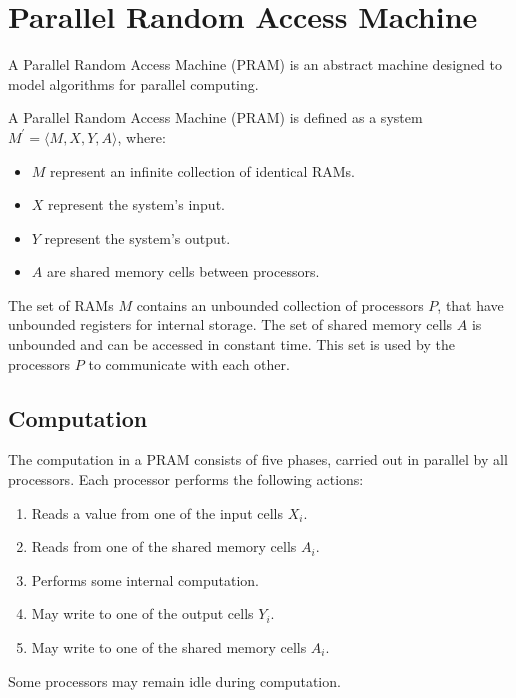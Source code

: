 \section{Parallel Random Access Machine}

A Parallel Random Access Machine (PRAM) is an abstract machine designed to model algorithms for parallel computing. 
\begin{definition}
    A Parallel Random Access Machine (PRAM) is defined as a system $M^\prime = \langle M, X, Y, A \rangle$, where:
\end{definition}
\begin{itemize}
    \item $M$ represent an infinite collection of identical RAMs. 
    \item $X$ represent the system's input.
    \item $Y$ represent the system's output.
    \item $A$ are shared memory cells between processors.
\end{itemize}
The set of RAMs $M$ contains an unbounded collection of processors $P$, that have unbounded registers for internal storage. 
The set of shared memory cells $A$ is unbounded and can be accessed in constant time.
This set is used by the processors $P$ to communicate with each other. 

\subsection{Computation}
The computation in a PRAM consists of five phases, carried out in parallel by all processors. 
Each processor performs the following actions:
\begin{enumerate}
    \item Reads a value from one of the input cells $X_i$.
    \item Reads from one of the shared memory cells $A_i$.
    \item Performs some internal computation.
    \item May write to one of the output cells $Y_i$.
    \item May write to one of the shared memory cells $A_i$.
\end{enumerate}
Some processors may remain idle during computation. 

